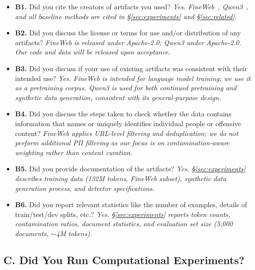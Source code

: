 \begin{itemize}[nosep,leftmargin=*]
\item[\checkmark] \textbf{B1.} Did you cite the creators of artifacts you used?
\textit{Yes. FineWeb~\citep{penedo2024fineweb}, Qwen3~\citep{yang2025qwen3}, and all baseline methods are cited in \S\ref{sec:experiments} and \S\ref{sec:related}.}

\item[\checkmark] \textbf{B2.} Did you discuss the license or terms for use and/or distribution of any artifacts?
\textit{FineWeb is released under Apache-2.0; Qwen3 under Apache-2.0. Our code and data will be released upon acceptance.}

\item[\checkmark] \textbf{B3.} Did you discuss if your use of existing artifacts was consistent with their intended use?
\textit{Yes. FineWeb is intended for language model training; we use it as a pretraining corpus. Qwen3 is used for both continued pretraining and synthetic data generation, consistent with its general-purpose design.}

\item[\checkmark] \textbf{B4.} Did you discuss the steps taken to check whether the data contains information that names or uniquely identifies individual people or offensive content?
\textit{FineWeb applies URL-level filtering and deduplication; we do not perform additional PII filtering as our focus is on contamination-aware weighting rather than content curation.}

\item[\checkmark] \textbf{B5.} Did you provide documentation of the artifacts?
\textit{Yes. \S\ref{sec:experiments} describes training data (132M tokens, FineWeb subset), synthetic data generation process, and detector specifications.}

\item[\checkmark] \textbf{B6.} Did you report relevant statistics like the number of examples, details of train/test/dev splits, etc.?
\textit{Yes. \S\ref{sec:experiments} reports token counts, contamination ratios, document statistics, and evaluation set size (5{,}000 documents, $\sim$4M tokens).}
\end{itemize}

\subsection*{C. Did You Run Computational Experiments?}

